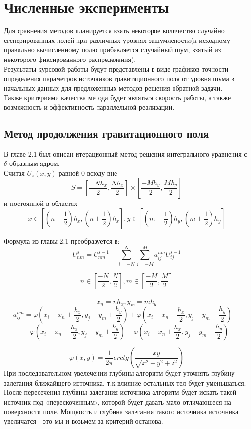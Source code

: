\documentclass[12pt]{article}
\begin{document}
\section
{Численные эксперименты}

Для сравнения методов планируется взять некоторое количество случайно сгенерированных полей при различных уровнях зашумлености(к исходному правильно вычисленному полю прибавляется случайный шум, взятый из некоторого фиксированного распределения).\\
Результаты курсовой работы будут представлены в виде графиков точности определения параметров источников гравитационного поля от уровня шума в начальных данных для предложенных методов решения обратной задачи.\\
Также критериями качества метода будет являться скорость работы, а также возможность и эффективность параллельной реализации.

\subsection
{Метод продолжения гравитационного поля}

В главе 2.1 был описан итерационный метод решения интегрального уравнения с $\delta$-образным ядром.\\
 Считая $U_z(x,y)$ равной 0 всюду вне $$S = \left[{\frac{-Nh_x}{2},\frac{Nh_x}{2}} \right] \times \left[{\frac{-Mh_y}{2},\frac{Mh_y}{2}} \right] $$ 
и постоянной в областях $$x \in \left[{\left({n-\frac{1}{2}}\right)h_x,\left({n+\frac{1}{2}}\right)h_x} \right] , y \in \left[\left({m-\frac{1}{2}}\right)h_y,\left({m+\frac{1}{2}}\right)h_y \right] $$ 

Формула из главы 2.1 преобразуется в:\\
\[U_{nm}^s=U_{nm}^{s-1}-\sum_{i=-N}^N{\sum_{j=-M}^M a_{ij}^{nm}U_{ij}^{s-1}}\]

$$n \in \left[{\frac{-N}{2},\frac{N}{2}} \right] , m \in \left[{\frac{-M}{2},\frac{M}{2}} \right] $$\\
$$x_n=nh_x, y_m=mh_y$$
\[a_{ij}^{nm} = \varphi(x_i-x_n+\frac{h_x}{2},y_j-y_m+\frac{h_y}{2}) + \varphi(x_i-x_n-\frac{h_x}{2},y_j-y_m-\frac{h_y}{2}) -\] \[- \varphi(x_i-x_n-\frac{h_x}{2},y_j-y_m+\frac{h_y}{2}) - \varphi(x_i-x_n+\frac{h_x}{2},y_j-y_m-\frac{h_y}{2})\]

\[\varphi(x,y)=\frac{1}{2\pi}arctg\left({\frac{xy}{\sqrt{x^2+y^2+z^2}}}\right)\]
\newline
При последовательном увелечении глубины алгоритм будет уточнять глубину залегания ближайщего источника, т.к влияние остальных тел будет уменьшаться.
После пересечения глубины залегания источника алгоритм будет искать такой источник под «перескоченным», которой будет давать мало отличающеся на поверхности поле. Мощность и глубина залегания такого источника источника увеличатся - это мы и возьмем за критерий останова.

\clearpage



\end{document}
